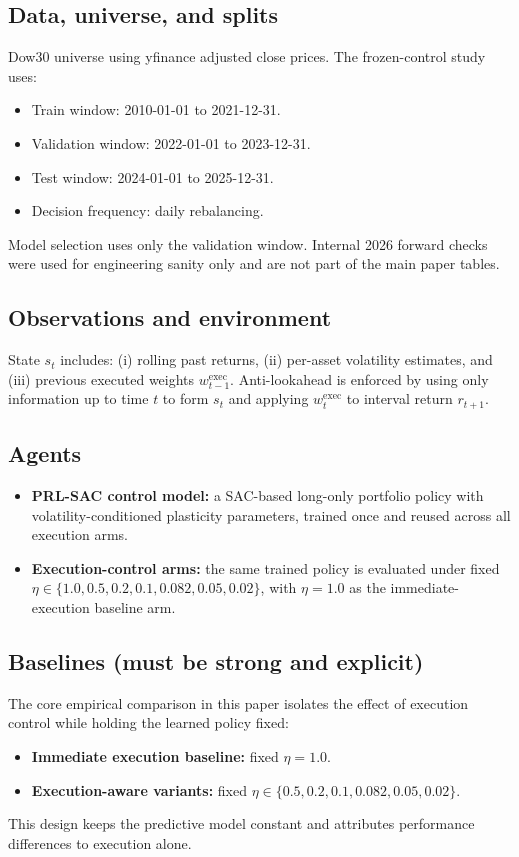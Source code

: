 \documentclass[10pt,twocolumn]{article}
\newcommand{\wexec}{w^{\mathrm{exec}}}
\begin{document}
\subsection{Data, universe, and splits}
Dow30 universe using yfinance adjusted close prices. The frozen-control study uses:
\begin{itemize}[leftmargin=*,itemsep=1pt]
\item Train window: 2010-01-01 to 2021-12-31.
\item Validation window: 2022-01-01 to 2023-12-31.
\item Test window: 2024-01-01 to 2025-12-31.
\item Decision frequency: daily rebalancing.
\end{itemize}
Model selection uses only the validation window. Internal 2026 forward checks were used for engineering sanity only and are not part of the main paper tables.

\subsection{Observations and environment}
State $s_t$ includes: (i) rolling past returns, (ii) per-asset volatility estimates, and (iii) previous executed weights $\wexec_{t-1}$. Anti-lookahead is enforced by using only information up to time $t$ to form $s_t$ and applying $\wexec_t$ to interval return $r_{t+1}$.

\subsection{Agents}
\begin{itemize}[leftmargin=*,itemsep=1pt]
\item \textbf{PRL-SAC control model:} a SAC-based long-only portfolio policy with volatility-conditioned plasticity parameters, trained once and reused across all execution arms.
\item \textbf{Execution-control arms:} the same trained policy is evaluated under fixed $\eta\in\{1.0, 0.5, 0.2, 0.1, 0.082, 0.05, 0.02\}$, with $\eta=1.0$ as the immediate-execution baseline arm.
\end{itemize}

\subsection{Baselines (must be strong and explicit)}
The core empirical comparison in this paper isolates the effect of execution control while holding the learned policy fixed:
\begin{itemize}[leftmargin=*,itemsep=1pt]
\item \textbf{Immediate execution baseline:} fixed $\eta=1.0$.
\item \textbf{Execution-aware variants:} fixed $\eta\in\{0.5, 0.2, 0.1, 0.082, 0.05, 0.02\}$.
\end{itemize}
This design keeps the predictive model constant and attributes performance differences to execution alone.
\end{document}
